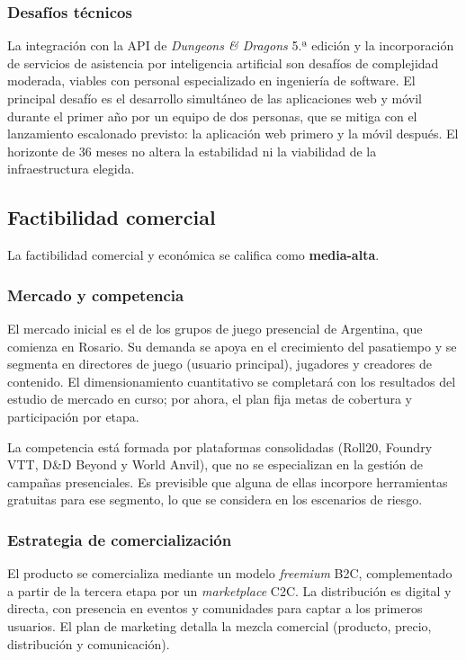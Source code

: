 \subsubsection{Desafíos técnicos}
La integración con la API de \textit{Dungeons \& Dragons} 5.ª edición y la incorporación de servicios de asistencia por inteligencia artificial son desafíos de complejidad moderada, viables con personal especializado en ingeniería de software. El principal desafío es el desarrollo simultáneo de las aplicaciones web y móvil durante el primer año por un equipo de dos personas, que se mitiga con el lanzamiento escalonado previsto: la aplicación web primero y la móvil después. El horizonte de 36 meses no altera la estabilidad ni la viabilidad de la infraestructura elegida.

\subsection{Factibilidad comercial}
La factibilidad comercial y económica se califica como \textbf{media-alta}.

\subsubsection{Mercado y competencia}
El mercado inicial es el de los grupos de juego presencial de Argentina, que comienza en Rosario. Su demanda se apoya en el crecimiento del pasatiempo y se segmenta en directores de juego (usuario principal), jugadores y creadores de contenido. El dimensionamiento cuantitativo se completará con los resultados del estudio de mercado en curso; por ahora, el plan fija metas de cobertura y participación por etapa.

La competencia está formada por plataformas consolidadas (Roll20, Foundry VTT, D\&D Beyond y World Anvil), que no se especializan en la gestión de campañas presenciales. Es previsible que alguna de ellas incorpore herramientas gratuitas para ese segmento, lo que se considera en los escenarios de riesgo.

\subsubsection{Estrategia de comercialización}
El producto se comercializa mediante un modelo \textit{freemium} B2C, complementado a partir de la tercera etapa por un \textit{marketplace} C2C. La distribución es digital y directa, con presencia en eventos y comunidades para captar a los primeros usuarios. El plan de marketing detalla la mezcla comercial (producto, precio, distribución y comunicación).

